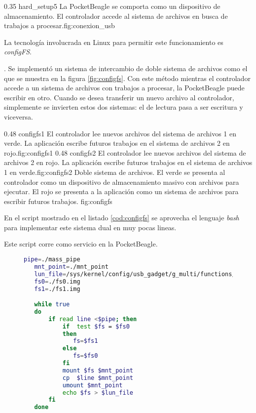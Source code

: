 \subfiga 
   {0.35} {hard_setup5} {La PocketBeagle se comporta como un dispositivo de almacenamiento. El controlador accede al sistema de archivos en busca de trabajos a procesar.}{fig:conexion_usb}

   La tecnología involucrada en Linux para permitir este funcionamiento es \textit{configFS}\citep{WEBSITE:configfs}.\par.
   Se implementó un sistema de intercambio de doble sistema de archivos como el que se muestra en la figura \ref{fig:configfs}.
   Con este método mientras el controlador accede a un sistema de archivos con trabajos a procesar, la PocketBeagle puede escribir en otro.
   Cuando se desea transferir un nuevo archivo al controlador, simplemente se invierten estos dos sistemas: el de lectura pasa a ser escritura y viceversa.

\subfigab 
   {0.48} {configfs1} {El controlador lee nuevos archivos del sistema de archivos 1 en verde. La aplicación escribe futuros trabajos en el sistema de archivos 2 en rojo.}{fig:configfs1}
   {0.48} {configfs2} {El controlador lee nuevos archivos del sistema de archivos 2 en rojo. La aplicación escribe futuros trabajos en el sistema de archivos 1 en verde.}{fig:configfs2}
   {Doble sistema de archivos. El verde se presenta al controlador como un dispositivo de almacenamiento masivo con archivos para ejecutar. El rojo se presenta a la aplicación como un sistema de archivos para escribir futuros trabajos.}
   {fig:configfs}

   En el script mostrado en el listado \ref{cod:configfs} se aprovecha el lenguaje \textit{bash} para implementar este sistema dual en muy pocas lineas.\par
   Este script corre como servicio en la PocketBeagle.

\begin{figure}[h]
   \begin{lstlisting}[language=bash,caption={Implementación de doble sistema de archivos conectado con la tecnología configFS. Se aprovecha la potencia de \textit{bash} y se corre como servicio.},label={cod:configfs}]
   pipe=./mass_pipe
   mnt_point=./mnt_point
   lun_file=/sys/kernel/config/usb_gadget/g_multi/functions/mass_storage.usb0/lun.0/file
   fs0=./fs0.img
   fs1=./fs1.img

   while true
   do
       if read line <$pipe; then
           if  test $fs = $fs0
           then
              fs=$fs1
           else
              fs=$fs0
           fi
           mount $fs $mnt_point
           cp  $line $mnt_point
           umount $mnt_point
           echo $fs > $lun_file
       fi
   done
   \end{lstlisting}
\end{figure}


